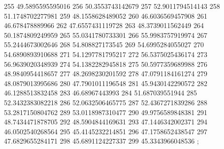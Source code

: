 {255 49.5895595595016
256 50.3553743142679
257 52.9011794514143
258 51.1748702277981
259 48.1558628489052
260 46.6036569457908
261 46.678478889966
262 47.6557431119728
263 48.3739011562449
264 50.1874809249959
265 55.0341780733301
266 55.9983757919974
267 55.2444673002646
268 54.808827173545
269 54.6995284055027
270 54.6890893910688
271 54.1297781795217
272 56.5375025436174
273 56.9639020348939
274 54.1382282945818
275 50.5977359689988
276 48.9840954418657
277 48.2698230201592
278 47.0791184161274
279 48.0879013995686
280 47.7901011196548
281 45.9430142290572
282 46.1288513832458
283 46.68967443993
284 51.687039551944
285 52.3432383082218
286 52.0632506465775
287 52.4367271839286
288 53.2817150804762
289 53.0118987310477
290 49.9756589848381
291 48.7434471878705
292 48.5904844169631
293 47.1446342002371
294 46.0502540268564
295 45.4145232214851
296 47.1758652438547
297 47.6829655284171
298 45.6891124227337
299 45.3343966048536
};
